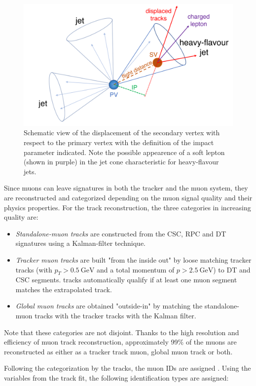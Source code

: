 \begin{figure}[h!]
	\centering
	\includegraphics[width=0.6\linewidth]{figures/experiment/pvsv}
	\caption{Schematic view of the displacement of the secondary vertex with respect to the primary vertex with the definition of the impact parameter indicated. Note the possible appearence of a soft lepton (shown in purple) in the jet cone characteristic for heavy-flavour jets. \cite{Sirunyan_2018}}
	\label{fig:pvsv}
\end{figure}


Since muons can leave signatures in both the tracker and the muon system, they are reconstructed and categorized depending on the muon signal quality and their physics properties. For the track reconstruction, the three categories in increasing quality are: \cite{Collaboration_2010}

\begin{itemize}
	\item[] \textit{Standalone-muon tracks} are constructed from the CSC, RPC and DT signatures using a Kalman-filter technique.
	\item[] \textit{Tracker muon tracks} are built "from the inside out" by loose matching tracker tracks (with $p_T > \SI{0.5}{\giga\electronvolt}$ and a total momentum of $p>\SI{2.5}{\giga\electronvolt}$) to DT and CSC segments. tracks automatically qualify if at least one muon segment matches the extrapolated track.
	\item[] \textit{Global muon tracks} are obtained "outside-in" by matching the standalone-muon tracks with the tracker tracks with the Kalman filter.
\end{itemize}

Note that these categories are not disjoint. Thanks to the high resolution and efficiency of muon track reconstruction, approximately 99\% of the muons are reconstructed as either as a tracker track muon, global muon track or both.

Following the categorization by the tracks, the muon IDs are assigned \cite{Sirunyan_2018_muons}. Using the variables from the track fit, the following identification types are assigned:

